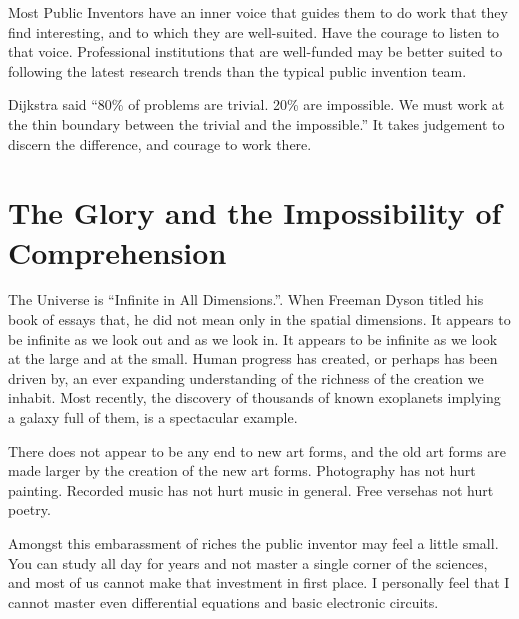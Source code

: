 \documentclass[
	fontsize=10pt, %
	twoside=false, %
	secnumdepth=1, %
]{kaobook}
\begin{document}
Most Public Inventors have an inner voice that guides them to do work that they
find interesting, and to which they are well-suited.
Have the courage to listen to that voice.
Professional institutions that are well-funded may be
better suited to following the latest research trends than the typical public invention team.

Dijkstra said ``80\% of problems are trivial. 20\% are impossible. We must work at the thin boundary between the trivial and the impossible.''
It takes judgement to discern the difference, and courage to work there.


\section{The Glory and the Impossibility of Comprehension}

The Universe is ``Infinite in All Dimensions.''\cite{Dyson1989}.
When Freeman Dyson titled his book of essays that, he did not mean
only in the spatial dimensions.
It appears to be infinite as we look out and as we look in.
It appears to be infinite as we look at the large and at the small.
Human progress has created, or perhaps has been driven by,
an ever expanding understanding of the richness of the creation
we inhabit. Most recently, the discovery of thousands of known
exoplanets implying a galaxy full of them, is a spectacular example.

There does not appear to be any end to new art forms, and the
old art forms are made larger by the creation of the new art forms.
Photography has not hurt painting.
Recorded music has not hurt music in general.
Free versehas not hurt poetry.

Amongst this embarassment of riches the public inventor
may feel a little small.
You can study all day for years and not master a single corner
of the sciences, and most of us cannot make that investment in
first place.
I personally feel that I cannot master even differential equations
and basic electronic circuits.
\end{document}
